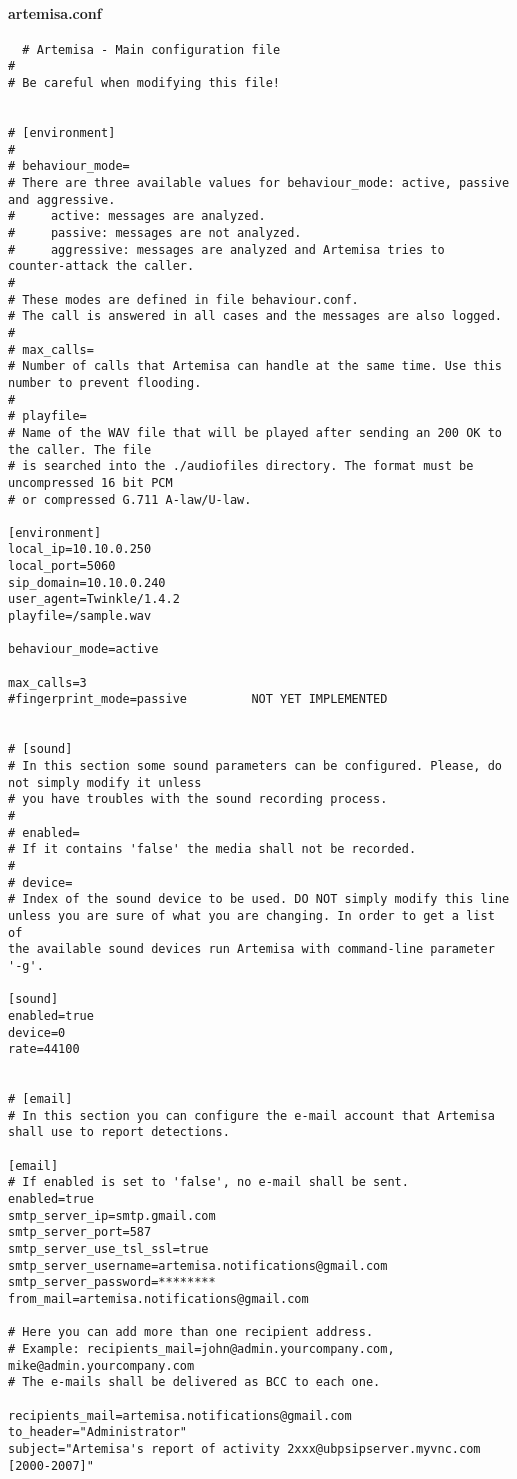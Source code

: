 \documentclass[a4paper,12pt]{report}
\newenvironment{myscriptlisting}
{\begin{list}{}{\setlength{\leftmargin}{1em}}\item\scriptsize\bfseries}
{\end{list}}
\begin{document}
\paragraph{artemisa.conf}
\begin{myscriptlisting}
 \begin{verbatim}
  # Artemisa - Main configuration file
#
# Be careful when modifying this file! 


# [environment]
#
# behaviour_mode=
# There are three available values for behaviour_mode: active, passive
and aggressive. 
#     active: messages are analyzed.
#     passive: messages are not analyzed.
#     aggressive: messages are analyzed and Artemisa tries to
counter-attack the caller.
#
# These modes are defined in file behaviour.conf.
# The call is answered in all cases and the messages are also logged.
#
# max_calls=
# Number of calls that Artemisa can handle at the same time. Use this
number to prevent flooding.
#
# playfile=
# Name of the WAV file that will be played after sending an 200 OK to
the caller. The file
# is searched into the ./audiofiles directory. The format must be
uncompressed 16 bit PCM 
# or compressed G.711 A-law/U-law.

[environment]
local_ip=10.10.0.250
local_port=5060
sip_domain=10.10.0.240
user_agent=Twinkle/1.4.2
playfile=/sample.wav

behaviour_mode=active

max_calls=3
#fingerprint_mode=passive         NOT YET IMPLEMENTED


# [sound]
# In this section some sound parameters can be configured. Please, do
not simply modify it unless
# you have troubles with the sound recording process. 
#
# enabled=
# If it contains 'false' the media shall not be recorded.
#
# device=
# Index of the sound device to be used. DO NOT simply modify this line
unless you are sure of what you are changing. In order to get a list of
the available sound devices run Artemisa with command-line parameter
'-g'. 

[sound]
enabled=true
device=0
rate=44100


# [email]
# In this section you can configure the e-mail account that Artemisa
shall use to report detections. 

[email]
# If enabled is set to 'false', no e-mail shall be sent. 
enabled=true
smtp_server_ip=smtp.gmail.com
smtp_server_port=587
smtp_server_use_tsl_ssl=true
smtp_server_username=artemisa.notifications@gmail.com
smtp_server_password=********
from_mail=artemisa.notifications@gmail.com

# Here you can add more than one recipient address.
# Example: recipients_mail=john@admin.yourcompany.com,
mike@admin.yourcompany.com
# The e-mails shall be delivered as BCC to each one. 

recipients_mail=artemisa.notifications@gmail.com
to_header="Administrator"
subject="Artemisa's report of activity 2xxx@ubpsipserver.myvnc.com
[2000-2007]"
 \end{verbatim}
\end{myscriptlisting}
\end{document}
